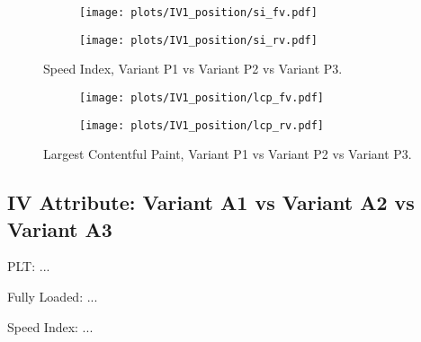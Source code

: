 \begin{figure}
	\centering
	\begin{subfigure}{.5\textwidth}
		\centering
		\texttt{[image: plots/IV1\_position/si\_fv.pdf]}
		\label{fig:sub1}
	\end{subfigure}%
	\begin{subfigure}{.5\textwidth}
		\centering
		\texttt{[image: plots/IV1\_position/si\_rv.pdf]}
		\label{fig:sub2}
	\end{subfigure}
	\caption{Speed Index, Variant P1 vs Variant P2 vs Variant P3.}
	\label{figure:plt_original_test}
\end{figure}


\begin{figure}
	\centering
	\begin{subfigure}{.5\textwidth}
		\centering
		\texttt{[image: plots/IV1\_position/lcp\_fv.pdf]}
		\label{fig:sub1}
	\end{subfigure}%
	\begin{subfigure}{.5\textwidth}
		\centering
		\texttt{[image: plots/IV1\_position/lcp\_rv.pdf]}
		\label{fig:sub2}
	\end{subfigure}
	\caption{Largest Contentful Paint, Variant P1 vs Variant P2 vs Variant P3.}
	\label{figure:plt_original_test}
\end{figure}


\clearpage





\subsection{IV Attribute: Variant A1 vs Variant A2 vs Variant A3}




PLT: ...

Fully Loaded: ...

Speed Index: ...


